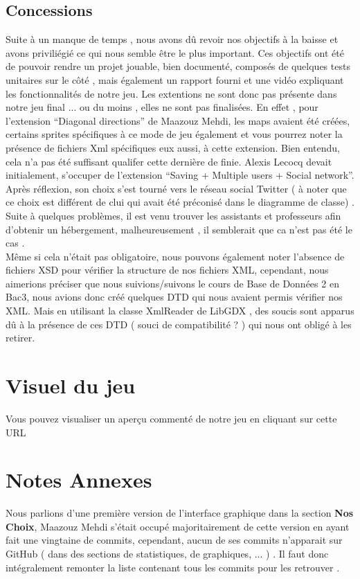 \documentclass[a4paper,10pt]{article}
\begin{document}
\subsection{Concessions}
Suite à un manque de temps , nous avons dû revoir nos objectifs à la baisse et avons priviliégié ce qui nous semble être le plus important. 
Ces objectifs ont été de pouvoir rendre un projet jouable, bien documenté, composés de quelques tests unitaires sur le côté , mais 
également un rapport fourni et une vidéo expliquant les fonctionnalités de notre jeu. 
Les extentions ne sont donc pas présente dans notre jeu final ... ou du moins , elles ne sont pas finalisées.
En effet , pour l'extension ``Diagonal directions'' de Maazouz Mehdi, les maps avaient été créées, certains sprites spécifiques à ce mode de jeu également
et vous pourrez noter la présence de fichiers Xml spécifiques eux aussi, à cette extension. Bien entendu, cela n'a pas été suffisant qualifer
cette dernière de finie.
Alexis Lecocq devait initialement, s'occuper de l'extension ``Saving + Multiple users + Social network''. Après réflexion, son choix
s'est tourné vers le réseau social Twitter ( à noter que ce choix est différent de clui qui avait été préconisé dans le diagramme de classe)
. Suite à quelques problèmes, il est venu trouver les assistants et professeurs afin d'obtenir un hébergement,
malheureusement , il semblerait que ca n'est pas été le cas .\\

Même si cela n'était pas obligatoire, nous pouvons également noter l'absence de fichiers XSD pour vérifier la structure de nos fichiers XML, cependant,
 nous aimerions préciser que nous suivions/suivons le cours de Base de Données 2 en Bac3, nous avions donc créé quelques DTD qui 
 nous avaient permis vérifier nos XML.
 Mais en utilisant la classe XmlReader de LibGDX , des soucis sont apparus dû à la présence de ces DTD ( souci de compatibilité ? ) qui nous ont obligé
 à les retirer.

\section{Visuel du jeu}
Vous pouvez visualiser un aperçu commenté de notre jeu en cliquant sur cette URL

\section{Notes Annexes}
Nous parlions d'une première version de l'interface graphique dans la section \textbf{Nos Choix}, Maazouz Mehdi s'était occupé majoritairement
de cette version en ayant fait une vingtaine de commits, cependant, aucun de ses commits n'apparait sur GitHub ( dans des sections de statistiques, 
de graphiques, ... ) . Il faut donc intégralement remonter la liste contenant tous les commits pour les retrouver .
\end{document}
